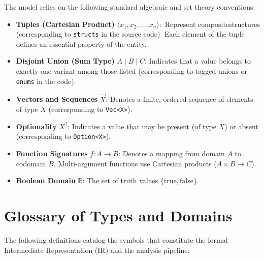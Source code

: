 The model relies on the following standard algebraic and set theory conventions:
\begin{itemize}
  \item \textbf{Tuples (Cartesian Product)} $\langle x_1, x_2, \dots,
    x_n \rangle$:\ Represent composite\linebreak structures (corresponding to
    \texttt{structs} in the source code). Each element of the tuple
    defines an essential property of the entity.
  \item \textbf{Disjoint Union (Sum Type)} $A \mid B \mid C$:
    Indicates that a value belongs to exactly one variant among those
    listed (corresponding to tagged unions or \texttt{enums} in the code).
  \item \textbf{Vectors and Sequences} $\vec{X}$: Denotes a finite,
    ordered sequence of elements of type $X$ (corresponding to \texttt{Vec<X>}).
  \item \textbf{Optionality} $X^?$: Indicates a value that may be
    present (of type $X$) or absent (corresponding to \texttt{Option<X>}).
  \item \textbf{Function Signatures} $f : A \to B$: Denotes a
    mapping from domain $A$ to codomain $B$. Multi-argument functions
    use Cartesian products ($A \times B \to C$).
  \item \textbf{Boolean Domain} $\mathbb{B}$: The set of truth values
    $\{ \text{true}, \text{false} \}$.
\end{itemize}

\section{Glossary of Types and Domains}
The following definitions catalog the symbols that constitute the
formal Intermediate Representation (IR) and the analysis pipeline.

